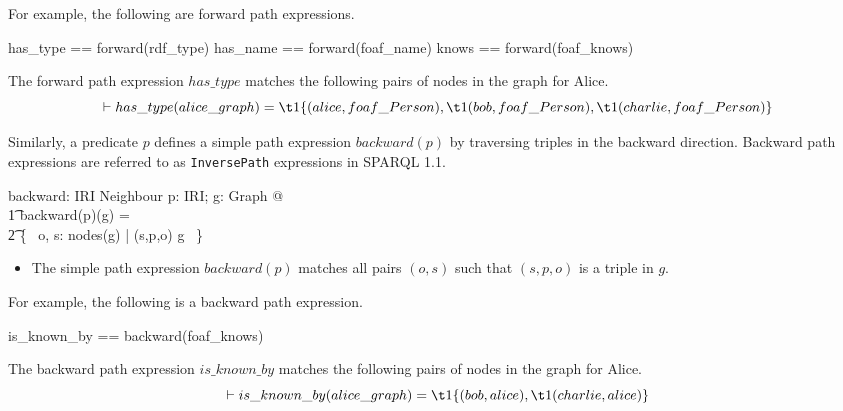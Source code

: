 \documentclass{article}
\begin{document}
For example, the following are forward path expressions.
\begin{zed}
	has\_type == forward(rdf\_type)
\also
	has\_name == forward(foaf\_name)
\also
	knows == forward(foaf\_knows)
\end{zed}

The forward path expression $has\_type$ matches the following pairs of nodes in the graph for Alice.
\[\vdash
	has\_type(alice\_graph) = \\
\t1		\{ (alice, foaf\_Person), \\
\t1		(bob, foaf\_Person), \\
\t1		(charlie, foaf\_Person) \}
\]

Similarly, a predicate $p$ defines a simple path expression $backward(p)$ by traversing triples in the backward direction.
Backward path expressions are referred to as {\tt InversePath} expressions in SPARQL 1.1.
\begin{axdef}
	backward: IRI \fun Neighbour
\where
	\forall p: IRI; g: Graph @ \\
\t1		backward(p)(g) = \\
\t2			\{~ o, s: nodes(g) | (s,p,o) \in g ~\}
\end{axdef}
\begin{itemize}
\item The simple path expression $backward(p)$ matches all pairs $(o,s)$ such that $(s,p,o)$ is a triple in $g$.
\end{itemize}

For example, the following is a backward path expression.
\begin{zed}
	is\_known\_by == backward(foaf\_knows)
\end{zed}

The backward path expression $is\_known\_by$ matches the following pairs of nodes in the graph for Alice.
\[\vdash 
	is\_known\_by(alice\_graph) = \\
\t1		\{ (bob, alice), \\
\t1		(charlie, alice) \}
\]
\end{document}
